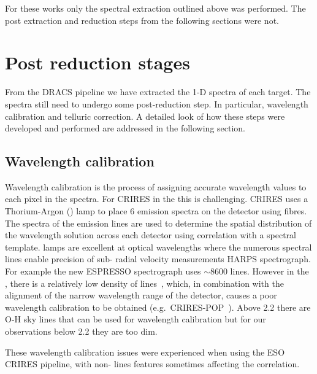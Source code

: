 For these works only the spectral extraction outlined above was performed. The post extraction and reduction steps from the following sections were not.


\section{Post reduction stages}
\label{sec:posreduction}
From the DRACS pipeline we have extracted the 1-D spectra of each target. The spectra still need to undergo some post-reduction step. In particular, wavelength calibration and telluric correction. A detailed look of how these steps were developed and performed are addressed in the following section.

\subsection{Wavelength calibration}
\label{subsec:wavecalib}

Wavelength calibration is the process of assigning accurate wavelength values to each pixel in the spectra. For CRIRES in the \nir{} this is challenging.
CRIRES uses a Thorium-Argon (\thar) lamp to place 6 emission spectra on the detector using fibres.
The spectra of the \thar{} emission lines are used to determine the spatial distribution of the wavelength solution across each detector using correlation with a spectral template.
\thar{} lamps are excellent at optical wavelengths where the numerous spectral lines enable precision of sub-\mps{} radial velocity measurements HARPS spectrograph. For example the new ESPRESSO spectrograph uses \(\sim8600\) \thar{} lines.
However in the \nir{}, there is a relatively low density of \thar{} lines~\citep{kerber_laboratory_2009}, which, in combination with the alignment of the narrow wavelength range of the detector, causes a poor wavelength calibration to be obtained (e.g.\ CRIRES-POP~\citep{nicholls_crirespop_2017}).
Above 2.2\um{} there are {O-H} sky lines that can be used for wavelength calibration but for our observations below 2.2\um{} they are too dim.

These wavelength calibration issues were experienced when using the ESO CRIRES pipeline, with non-\thar{} lines features sometimes affecting the correlation.

